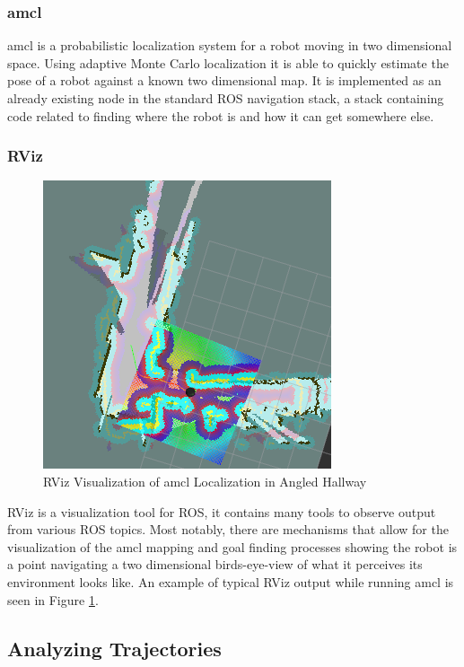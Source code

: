 \documentclass{article}[12]
\begin{document}
		\subsubsection{amcl}
		
		amcl is a probabilistic localization system for a robot moving in two dimensional space. Using adaptive Monte Carlo localization \cite{doucet_freitas_gordon_2001} it is able to quickly estimate the pose of a robot against a known two dimensional map. It is implemented as an already existing node in the standard ROS navigation stack, a stack containing code related to finding where the robot is and how it can get somewhere else.
		
		\subsubsection{RViz}
		
		\begin{figure}[]
			\centering
			\includegraphics[width=0.5\linewidth]{rviz_screenshot}
			\caption{RViz Visualization of amcl Localization in Angled Hallway}
			\label{fig:rviz}
		\end{figure}
		
		RViz is a visualization tool for ROS, it contains many tools to observe output from various ROS topics. Most notably, there are mechanisms that allow for the visualization of the amcl mapping and goal finding processes showing the robot is a point navigating a two dimensional birds-eye-view of what it perceives its environment looks like. An example of typical RViz output while running amcl is seen in Figure \ref{fig:rviz}.
	
	\subsection{Analyzing Trajectories}
	
\end{document}
